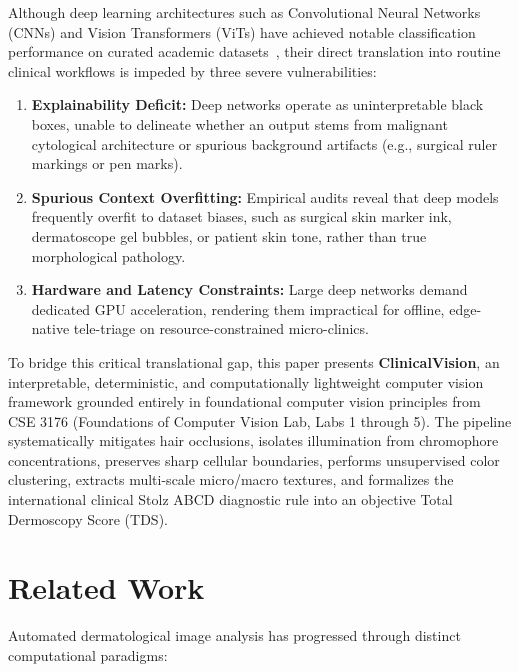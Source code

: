 \documentclass[conference]{IEEEtran}
\begin{document}
Although deep learning architectures such as Convolutional Neural Networks (CNNs) and Vision Transformers (ViTs) have achieved notable classification performance on curated academic datasets~\cite{tschandl2018ham10000}, their direct translation into routine clinical workflows is impeded by three severe vulnerabilities:
\begin{enumerate}
    \item \textbf{Explainability Deficit:} Deep networks operate as uninterpretable black boxes, unable to delineate whether an output stems from malignant cytological architecture or spurious background artifacts (e.g., surgical ruler markings or pen marks).
    \item \textbf{Spurious Context Overfitting:} Empirical audits reveal that deep models frequently overfit to dataset biases, such as surgical skin marker ink, dermatoscope gel bubbles, or patient skin tone, rather than true morphological pathology.
    \item \textbf{Hardware and Latency Constraints:} Large deep networks demand dedicated GPU acceleration, rendering them impractical for offline, edge-native tele-triage on resource-constrained micro-clinics.
\end{enumerate}

To bridge this critical translational gap, this paper presents \textbf{ClinicalVision}, an interpretable, deterministic, and computationally lightweight computer vision framework grounded entirely in foundational computer vision principles from CSE 3176 (Foundations of Computer Vision Lab, Labs 1 through 5). The pipeline systematically mitigates hair occlusions, isolates illumination from chromophore concentrations, preserves sharp cellular boundaries, performs unsupervised color clustering, extracts multi-scale micro/macro textures, and formalizes the international clinical Stolz ABCD diagnostic rule into an objective Total Dermoscopy Score (TDS).

\section{Related Work}
Automated dermatological image analysis has progressed through distinct computational paradigms:
\end{document}

